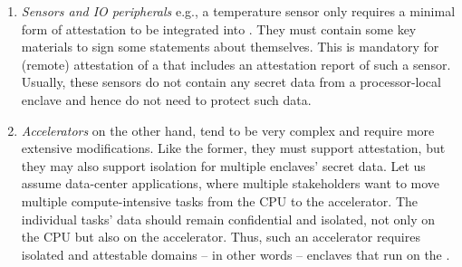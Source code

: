 \begin{enumerate}
\item\emph{Sensors and IO peripherals} e.g., a temperature sensor only requires a minimal form of attestation to be integrated into \name{}. They must contain some key materials to sign some statements about themselves. This is mandatory for (remote) attestation of a \nameenclave that includes an attestation report of such a sensor. Usually, these sensors do not contain any secret data from a processor-local enclave and hence do not need to protect such data.

\item\emph{Accelerators} on the other hand, tend to be very complex and require more extensive modifications. Like the former, they must support attestation, but they may also support isolation for multiple enclaves' secret data. Let us assume data-center applications, where multiple stakeholders want to move multiple compute-intensive tasks from the CPU to the accelerator. The individual tasks' data should remain confidential and isolated, not only on the CPU but also on the accelerator. Thus, such an accelerator requires isolated and attestable domains -- in other words -- enclaves that run on the \sphw. 

\end{enumerate}



